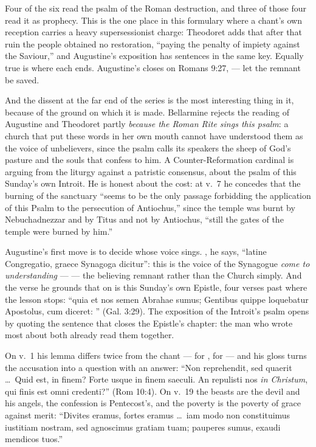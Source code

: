 Four of the six read the psalm of the Roman destruction, and three of those
four read it as prophecy. This is the
one place in this formulary where a chant's own reception carries a heavy
supersessionist charge: Theodoret adds that after that ruin the people obtained
no restoration, ``paying the penalty of impiety against the Saviour,'' and
Augustine's exposition has sentences in the same key. Equally true is where
each ends. Augustine's  closes on Romans 9:27,
 --- let the remnant be saved.

And the dissent at the far end of the series is the most interesting thing in
it, because of the ground on which it is made. Bellarmine rejects the reading
of Augustine and Theodoret partly \emph{because the Roman Rite sings this
psalm}: a church that put these words in her own mouth cannot have understood
them as the voice of unbelievers, since the psalm calls its speakers the sheep
of God's pasture and the souls that confess to him. A Counter-Reformation
cardinal is arguing from the liturgy against a patristic consensus, about the
psalm of this Sunday's own Introit. He is honest about the cost: at v.~7 he
concedes that the burning of the sanctuary ``seems to be the only passage
forbidding the application of this Psalm to the persecution of Antiochus,''
since the temple was burnt by Nebuchadnezzar and by Titus and not by Antiochus,
``still the gates of the temple were burned by him.''

\begin{witnessnote}
Augustine's first move is to decide whose voice sings. , he says,
``latine Congregatio, graece Synagoga dicitur'': this is the voice of the
Synagogue \textit{come to understanding} ---  --- the
believing remnant rather than the Church simply. And the verse he grounds that
on is this Sunday's own Epistle, four verses past where the lesson stops:
``quia et nos semen Abrahae sumus; Gentibus quippe loquebatur Apostolus, cum
diceret: ''
(Gal. 3:29). The exposition of the Introit's psalm opens by quoting the
sentence that closes the Epistle's chapter: the man who wrote most about both
already read them together.

On v.~1 his lemma differs twice from the chant ---  for
,  for  --- and
his gloss turns the accusation into a question with an answer: ``Non
reprehendit, sed quaerit \dots\ Quid est, in finem? Forte usque in finem
saeculi. An repulisti nos \textit{in Christum}, qui finis est omni
credenti?'' (Rom 10:4). On v.~19 the beasts are the devil and his angels, the
confession is Pentecost's, and the poverty is the poverty of grace against
merit: ``Divites eramus, fortes eramus \dots\ iam modo non constituimus
iustitiam nostram, sed agnoscimus gratiam tuam; pauperes sumus, exaudi mendicos
tuos.''
\end{witnessnote}

